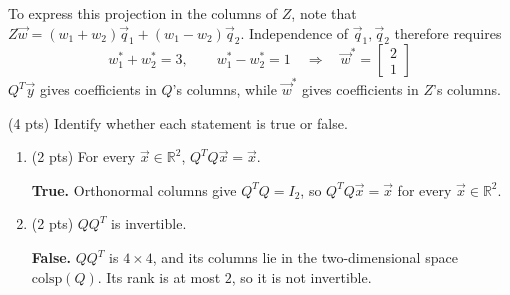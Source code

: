 \documentclass[11pt]{article}
\begin{document}
\begin{prob}[(16 pts)]
\begin{subprob}
\begin{solution}
To express this projection in the columns of $Z$, note that $Z\vec w=(w_1+w_2)\vec q_1+(w_1-w_2)\vec q_2$. Independence of $\vec q_1,\vec q_2$ therefore requires
\[
w_1^\ast+w_2^\ast=3,\qquad w_1^\ast-w_2^\ast=1
\quad\Longrightarrow\quad
\boxed{\vec w^\ast=\begin{bmatrix}2\\1\end{bmatrix}}
\]
$Q^T\vec y$ gives coefficients in $Q$'s columns, while $\vec w^\ast$ gives coefficients in $Z$'s columns.
\end{solution}
\end{subprob}
\vspace{0.2cm}
\vspace{0.3em}
\begin{subprob}(4 pts)
Identify whether each statement is true or false. \\

\begin{enumerate}[label=(\roman*)]
\item (2 pts) For every $\vec x\in\mathbb R^2$, $Q^TQ\vec x=\vec x$.
 

\begin{solution}
\textbf{True.} Orthonormal columns give $Q^TQ=I_2$, so $Q^TQ\vec x=\vec x$ for every $\vec x\in\mathbb R^2$.
\end{solution}
\item (2 pts) $QQ^T$ is invertible.
 

\begin{solution}
\textbf{False.} $QQ^T$ is $4\times4$, and its columns lie in the two-dimensional space $\text{colsp}(Q)$. Its rank is at most $2$, so it is not invertible.
\end{solution}
\end{enumerate}
\end{subprob}
\end{prob}
\newpage
\end{document}
